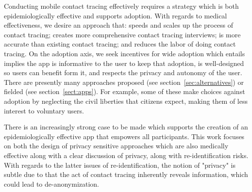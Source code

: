 \documentclass{article}
\begin{document}
Conducting mobile contact tracing effectively requires a strategy which is both epidemiologically effective and supports adoption. 
With regards to medical effectiveness, we desire an approach that: speeds and scales up the process of contact tracing; creates more comprehensive contact tracing interviews; is more accurate than existing contact tracing; and reduces the labor of doing contact tracing.  On the adoption axis, we seek incentives for wide adoption which entails implies the app is informative to the user to keep that adoption, is well-designed so users can benefit form it, and respects the privacy and autonomy of the user.  There are presently many approaches proposed (see section~\ref{sec:alternatives}) or fielded (see section~\ref{sect:apps}).  For example, some of these make choices against adoption by neglecting the civil liberties that citizens expect, making them of less interest to voluntary users.  

There is an increasingly strong case to be made which supports the creation of  an epidemiologically effective app that empowers all participants.  This work focuses on  both the design of privacy sensitive approaches which are also medically effective along with a clear discussion of privacy, along with re-identification risks.
With regards to the latter issues of re-identification, the notion of "privacy" is subtle due to that  the act of contact tracing inherently reveals information, which could lead to de-anonymization.  
\end{document}
